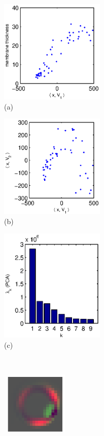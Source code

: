 \documentclass[12pt]{article}
\begin{document}
\begin{figure}
\begin{minipage}{5.1cm}
\centering
\includegraphics[width=5cm]{PCA_membrane_corr} \\
(a)
\end{minipage}
\begin{minipage}{5.1cm}
\centering
\includegraphics[width=5cm]{PCA_12}\\
(b)
\end{minipage}
\begin{minipage}{5.1cm}
\centering
\includegraphics[width=5cm]{evals}\\
(c)
\end{minipage}\\
\begin{minipage}{12.5cm}
\centering\
\includegraphics[width=3cm]{eigenimage_1}

\end{minipage}
\end{figure}
\end{document}
